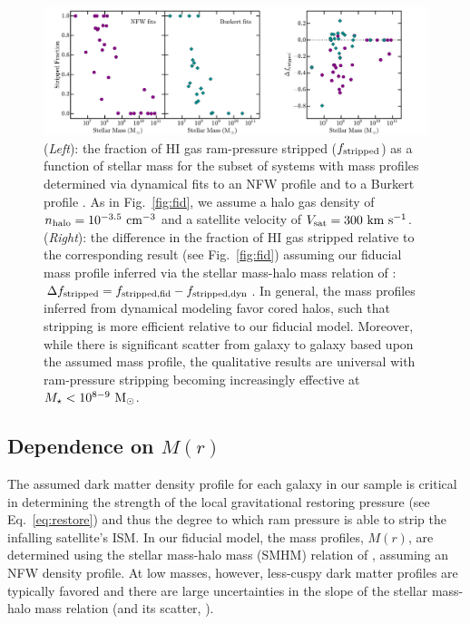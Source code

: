 \documentclass[usenatbib]{mn2e}
\newcommand{\mstar}{{M}_{\star}}
\newcommand{\msun}{{\rm M}_{\odot}}
\begin{document}
\begin{figure}
 \centering
 \hspace*{-0.25in}
   \includegraphics[width=7.7in]{f4.pdf}
   \caption{(\emph{Left}): the fraction of H{\scriptsize I} gas
     ram-pressure stripped ($f_{\rm stripped}$) as a function of
     stellar mass for the subset of systems with mass profiles
     determined via dynamical fits to an NFW profile \citep{deblok08,
       oh15} and to a Burkert profile \citep{pace16}. As in
     Fig.~\ref{fig:fid}, we assume a halo gas density of $n_{\rm
       halo}=10^{-3.5}~{\rm cm}^{-3}$ and a satellite velocity of
     $V_{\rm sat}=300~{\rm km}~{\rm s}^{-1}$. (\emph{Right}): the
     difference in the fraction of H{\scriptsize I} gas stripped
     relative to the corresponding result (see Fig.~\ref{fig:fid})
     assuming our fiducial mass profile inferred via the stellar
     mass-halo mass relation of \citet{gk14}: ${\Delta}f_{\rm
       stripped} = f_{\rm stripped, fid} - f_{\rm stripped, dyn}$. In
     general, the mass profiles inferred from dynamical modeling favor
     cored halos, such that stripping is more efficient relative to
     our fiducial model. Moreover, while there is significant scatter
     from galaxy to galaxy based upon the assumed mass profile, the
     qualitative results are universal with ram-pressure stripping
     becoming increasingly effective at $\mstar<10^{8-9}~\msun$. }
 \label{fig:mass}
\end{figure}
 


\subsection{Dependence on \boldmath$M(r)$}
\label{subsec:dMr}

The assumed dark matter density profile for each galaxy in our sample
is critical in determining the strength of the local gravitational
restoring pressure (see Eq.~\ref{eq:restore}) and thus the degree to
which ram pressure is able to strip the infalling satellite's ISM.
%
In our fiducial model, the mass profiles, $M(r)$, are determined using
the stellar mass-halo mass (SMHM) relation of \citet{gk14}, assuming
an NFW density profile.
%
At low masses, however, less-cuspy dark matter profiles are typically
favored and there are large uncertainties in the slope of the stellar
mass-halo mass relation (and its scatter, \citealt{gk16}).
%
\end{document}
